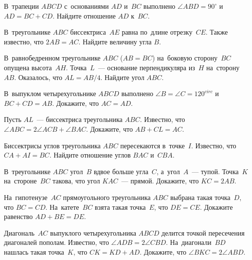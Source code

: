 


\begin{problems}

\item
В~трапеции $ABCD$ с~основаниями $AD$ и~$BC$ выполнено $\angle ABD = 90^{\circ}$
и~$AD = BC + CD$.
Найдите отношение $AD$ к~$BC$.

\item
В~треугольнике $ABC$ биссектриса~$AE$ равна по~длине отрезку~$CE$.
Также известно, что $2 AB = AC$.
Найдите величину угла $B$.

\item
В~равнобедренном треугольнике $ABC$ ($AB = BC$) на~боковую сторону~$BC$ опущена
высота~$AH$.
Точка~$L$~--- основание перпендикуляра из~$H$ на~сторону~$AB$.
Оказалось, что $AL = AB / 4$.
Найдите угол $ABC$.

\item
В~выпуклом четырехугольнике $ABCD$ выполнено $\angle B = \angle C = 120^{circ}$
и~$BC + CD = AB$.
Докажите, что $AC = AD$.

\item
Пусть $AL$~--- биссектриса треугольника $ABC$.
Известно, что $\angle ABC = 2 \angle ACB + \angle BAC$.
Докажите, что $AB + CL = AC$.

\item
Биссектрисы углов треугольника $ABC$ пересекаются в~точке~$I$.
Известно, что $CA + AI = BC$.
Найдите отношение углов $BAC$ и~$CBA$.

\item
В~треугольнике $ABC$ угол~$B$ вдвое больше угла~$C$, а~угол~$A$~--- тупой.
Точка~$K$ на~стороне~$BC$ такова, что угол $KAC$~--- прямой.
Докажите, что $KC = 2 AB$.

\item
На~гипотенузе~$AC$ прямоугольного треугольника $ABC$ выбрана такая точка~$D$,
что $BC = CD$.
На~катете~$BC$ взята такая точка~$E$, что $DE = CE$.
Докажите равенство $AD + BE = DE$.

\item
Диагональ~$AC$ выпуклого четырехугольника $ABCD$ делится точкой пересечения
диагоналей пополам.
Известно, что $\angle ADB = 2 \angle CBD$.
На~диагонали~$BD$ нашлась такая точка~$K$, что $CK = KD + AD$.
Докажите, что $\angle BKC = 2 \angle ABD$.



\end{problems}

